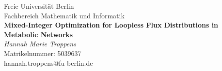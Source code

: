 \begin{titlepage}
\thispagestyle{empty}
\newcommand{\HRule}{\rule{\linewidth}{0.5mm}}
\hspace{1cm}
\center

{\huge Freie Universität Berlin}\\[1.0cm]
{\Large Fachbereich Mathematik und Informatik}\\[0.8cm]



{ \huge \bfseries Mixed-Integer Optimization for Loopless Flux Distributions in Metabolic Networks}\\[4cm]
{\textit{Hannah Marie Troppens}}\\
{Matrikelnummer: 5039637}\\
{hannah.troppens@fu-berlin.de}\\[1cm]

\vspace{1cm}
\myformat{\today}
\end{titlepage}
\restoregeometry

